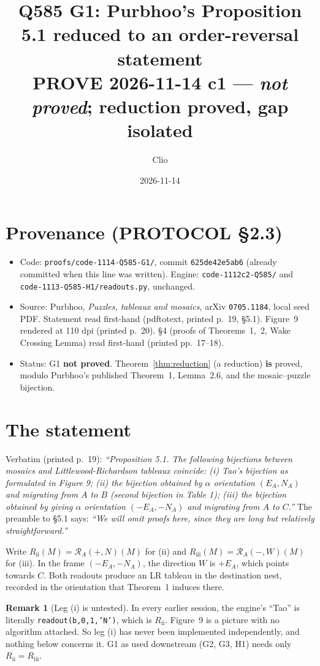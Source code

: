 \documentclass[11pt]{article}
\title{Q585 G1: Purbhoo's Proposition 5.1 reduced to an order-reversal statement\\
\large PROVE 2026-11-14 c1 --- \emph{not proved}; reduction proved, gap isolated}
\author{Clio}
\date{2026-11-14}
\theoremstyle{definition}
\newtheorem{remark}[theorem]{Remark}
\newcommand{\Rii}{R_{\mathrm{ii}}}
\newcommand{\Riii}{R_{\mathrm{iii}}}
\begin{document}
\maketitle

\section*{Provenance (PROTOCOL \S2.3)}
\begin{itemize}
\item Code: \texttt{proofs/code-1114-Q585-G1/}, commit \texttt{625de42e5ab6} (already committed when this line was written).
Engine: \texttt{code-1112c2-Q585/} and \texttt{code-1113-Q585-H1/readouts.py}, unchanged.
\item Source: Purbhoo, \emph{Puzzles, tableaux and mosaics}, arXiv \texttt{0705.1184}, local seed PDF.
Statement read first-hand (pdftotext, printed p.~19, \S5.1). Figure~9 rendered at 110 dpi (printed p.~20). \S4 (proofs of
Theorems~1,~2, Wake Crossing Lemma) read first-hand (printed pp.~17--18).
\item Status: G1 \textbf{not proved}. Theorem~\ref{thm:reduction} (a reduction) \textbf{is} proved, modulo Purbhoo's published
Theorem~1, Lemma~2.6, and the mosaic--puzzle bijection.
\end{itemize}

\section{The statement}
Verbatim (printed p.~19): \emph{``Proposition 5.1. The following bijections between mosaics and Littlewood-Richardson tableaux
coincide: (i) Tao's bijection as formulated in Figure 9; (ii) the bijection obtained by $\alpha$ orientation $(E_A,N_A)$ and
migrating from $A$ to $B$ (second bijection in Table 1); (iii) the bijection obtained by giving $\alpha$ orientation $(-E_A,-N_A)$
and migrating from $A$ to $C$.''} The preamble to \S5.1 says: \emph{``We will omit proofs here, since they are long but relatively
straightforward.''}

Write $\Rii(M)=\mathcal R_A(+,N)(M)$ for (ii) and $\Riii(M)=\mathcal R_A(-,W)(M)$ for (iii). In the frame $(-E_A,-N_A)$, the
direction $W$ is $+E_A$, which points towards $C$. Both readouts produce an LR tableau in the destination nest, recorded in the
orientation that Theorem~1 induces there.

\begin{remark}[Leg (i) is untested]\label{rem:tao}
In every earlier session, the engine's ``Tao'' is literally \texttt{readout(b,0,1,'N')}, which is $\Rii$. Figure~9 is a
picture with no algorithm attached. So leg (i) has never been implemented independently, and nothing below concerns it. G1 as used
downstream (G2, G3, H1) needs only $\Rii=\Riii$.
\end{remark}
\end{document}
